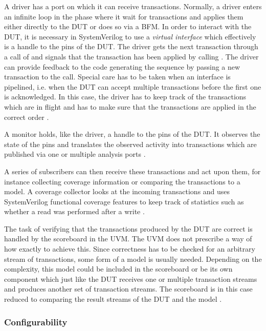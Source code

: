 A driver has a port on which it can receive transactions. Normally, a driver enters an infinite loop in the 
phase where it wait for transactions and applies them either directly to the DUT or does so via a BFM. In order to
interact with the DUT, it is necessary in SystemVerilog to use a \textit{virtual interface} which effectively is a
handle to the pins of the DUT. The driver gets the next transaction through a call of  and
signals that the transaction has been applied by calling . The driver can provide feedback to the
code generating the sequence by passing a new transaction to the  call. Special care has to be taken
when an interface is pipelined, i.e. when the DUT can accept multiple transactions before the first one is
acknowledged. In this case, the driver has to keep track of the transactions which are in flight and has to make sure
that the transactions are applied in the correct order \cite[ch. 4.7]{mehta2018asic}.

A monitor holds, like the driver, a handle to the pins of the DUT. It observes the state of the pins and translates
the observed activity into transactions which are published via one or multiple analysis ports \cite[Ch. 4.3]{mehta2018asic}.

A series of subscribers can then receive these transactions and act upon them, for instance collecting coverage
information or comparing the transactions to a model. A coverage collector looks at the incoming transactions and
uses SystemVerilog functional coverage features to keep track of statistics such as whether a read was performed
after a write \cite[Ch. 4.3]{mehta2018asic}.

The task of verifying that the transactions produced by the DUT are correct is handled by the scoreboard in the UVM.
The UVM does not prescribe a way of how exactly to achieve this. Since correctness has to be checked for an arbitrary
stream of transactions, some form of a model is usually needed. Depending on the complexity, this model could be
included in the scoreboard or be its own component which just like the DUT receives one or multiple transaction
streams and produces another set of transaction streams. The scoreboard is in this case reduced to comparing the
result streams of the DUT and the model \cite[Ch. 4.3]{mehta2018asic}.

\subsubsection{Configurability} %

